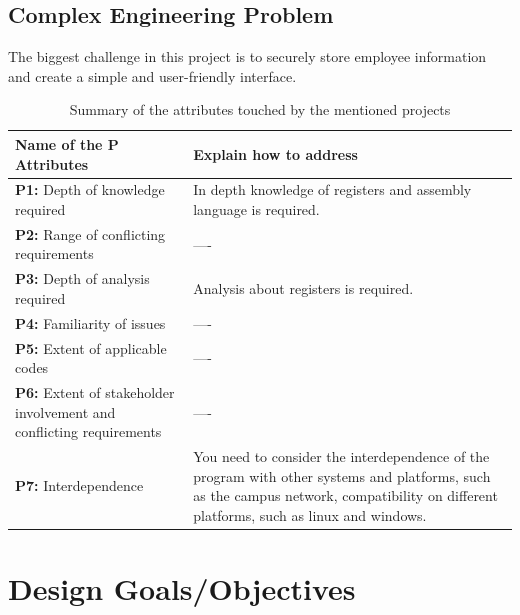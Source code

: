 \documentclass[12pt]{report}
\begin{document}
\subsection{Complex Engineering Problem}

The biggest challenge in this project is to securely store employee information and create a simple and user-friendly interface.


\begin{table}[htbp]
   \centering
    \caption{Summary of the attributes touched by the mentioned projects}
    \begin{tabular}{|p{6.0 cm}|p{8 cm}|}
    \toprule
        \textbf{Name of the P Attributes} & \textbf{Explain how to address}  \\
        \midrule

    \textbf{P1:} Depth of knowledge required  &  In depth knowledge of registers and assembly language is required.\\
      \hline
       
    \textbf{P2:} Range of conflicting
     requirements  &  ---- \\
      \hline

    \textbf{P3:} Depth of analysis required  &  Analysis about registers is required.\\
    \hline
    
    \textbf{P4:} Familiarity of issues  &  ---- \\ 
    \hline
    \textbf{P5:} Extent of applicable codes  &  ---- \\
      \hline
       
    \textbf{P6:} Extent of stakeholder
     involvement and conflicting
     requirements  &  ---- \\
      \hline

    \textbf{P7:} Interdependence  &  You need to consider the interdependence of the program with other systems and platforms, such as the campus network, compatibility on different platforms, such as linux and windows. \\
    \hline
        
    \end{tabular}
    \label{tab:IC}
\end{table}

\section{Design Goals/Objectives}
\end{document}
